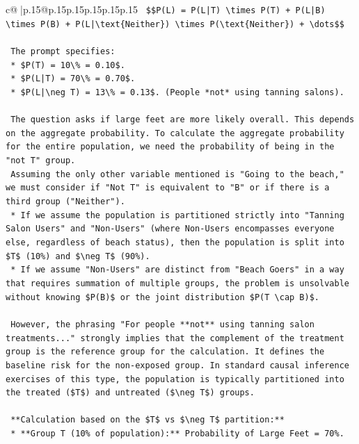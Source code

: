 \documentclass{article}
\begin{document}
{\begin{supertabular}{c@{$\;$}|p{.15\linewidth}@{}p{.15\linewidth}p{.15\linewidth}p{.15\linewidth}p{.15\linewidth}p{.15\linewidth}}
{{{\texttt{    \$\$P(L) = P(L|T) \textbackslash{}times P(T) + P(L|B) \textbackslash{}times P(B) + P(L|\textbackslash{}text\{Neither\}) \textbackslash{}times P(\textbackslash{}text\{Neither\}) + \textbackslash{}dots\$\$} \\
\\ 
\texttt{    The prompt specifies:} \\
\texttt{    *   \$P(T) = 10\textbackslash{}\% = 0.10\$.} \\
\texttt{    *   \$P(L|T) = 70\textbackslash{}\% = 0.70\$.} \\
\texttt{    *   \$P(L|\textbackslash{}neg T) = 13\textbackslash{}\% = 0.13\$. (People *not* using tanning salons).} \\
\\ 
\texttt{    The question asks if large feet are more likely overall. This depends on the aggregate probability. To calculate the aggregate probability for the entire population, we need the probability of being in the "not T" group.} \\
\texttt{    Assuming the only other variable mentioned is "Going to the beach," we must consider if "Not T" is equivalent to "B" or if there is a third group ("Neither").} \\
\texttt{    *   If we assume the population is partitioned strictly into "Tanning Salon Users" and "Non{-}Users" (where Non{-}Users encompasses everyone else, regardless of beach status), then the population is split into \$T\$ (10\%) and \$\textbackslash{}neg T\$ (90\%).} \\
\texttt{    *   If we assume "Non{-}Users" are distinct from "Beach Goers" in a way that requires summation of multiple groups, the problem is unsolvable without knowing \$P(B)\$ or the joint distribution \$P(T \textbackslash{}cap B)\$.} \\
\\ 
\texttt{    However, the phrasing "For people **not** using tanning salon treatments..." strongly implies that the complement of the treatment group is the reference group for the calculation. It defines the baseline risk for the non{-}exposed group. In standard causal inference exercises of this type, the population is typically partitioned into the treated (\$T\$) and untreated (\$\textbackslash{}neg T\$) groups.} \\
\\ 
\texttt{    **Calculation based on the \$T\$ vs \$\textbackslash{}neg T\$ partition:**} \\
\texttt{    *   **Group T (10\% of population):** Probability of Large Feet = 70\%.} \\
}}}
\end{supertabular}}
\end{document}
